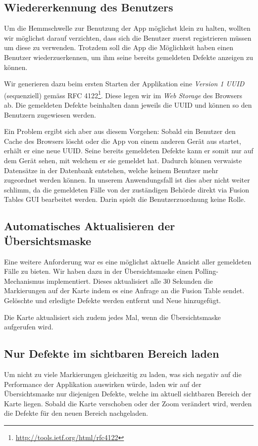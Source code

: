 \subsection{Wiedererkennung des Benutzers}
\label{fixmystreet-user-detection}
Um die Hemmschwelle zur Benutzung der App möglichst klein zu halten, wollten wir möglichst darauf verzichten, dass sich die Benutzer zuerst registrieren müssen um diese zu verwenden. Trotzdem soll die App die Möglichkeit haben einen Benutzer wiederzuerkennen, um ihm seine bereits gemeldeten Defekte anzeigen zu können.

Wir generieren dazu beim ersten Starten der Applikation eine \emph{Version 1 \gls{UUID}} (sequenziell) gemäss RFC 4122\footnote{\url{http://tools.ietf.org/html/rfc4122}}. Diese legen wir im \emph{Web Storage} des Browsers ab. Die gemeldeten Defekte beinhalten dann jeweils die \gls{UUID} und können so den Benutzern zugewiesen werden.

Ein Problem ergibt sich aber aus diesem Vorgehen: Sobald ein Benutzer den Cache des Browsers löscht oder die App von einem anderen Gerät aus startet, erhält er eine neue \gls{UUID}. Seine bereits gemeldeten Defekte kann er somit nur auf dem Gerät sehen, mit welchem er sie gemeldet hat. Dadurch können verwaiste Datensätze in der Datenbank entstehen, welche keinem Benutzer mehr zugeordnet werden können. In unserem Anwendungsfall ist dies aber nicht weiter schlimm, da die gemeldeten Fälle von der zuständigen Behörde direkt via Fusion Tables GUI bearbeitet werden. Darin spielt die Benutzerzuordnung keine Rolle.

\subsection{Automatisches Aktualisieren der Übersichtsmaske}
\label{fixmystreet-polling}
Eine weitere Anforderung war es eine möglichst aktuelle Ansicht aller gemeldeten Fälle zu bieten. Wir haben dazu in der Übersichtsmaske einen Polling-Mechanismus implementiert. Dieses aktualisiert alle 30 Sekunden die Markierungen auf der Karte indem es eine Anfrage an die Fusion Table sendet. Gelöschte und erledigte Defekte werden entfernt und Neue hinzugefügt.

Die Karte aktualisiert sich zudem jedes Mal, wenn die Übersichtsmaske aufgerufen wird.

\subsection{Nur Defekte im sichtbaren Bereich laden}
Um nicht zu viele Markierungen gleichzeitig zu laden, was sich negativ auf die Performance der Applikation auswirken würde, laden wir auf der Übersichtsmaske nur diejenigen Defekte, welche im aktuell sichtbaren Bereich der Karte liegen. Sobald die Karte verschoben oder der Zoom verändert wird, werden die Defekte für den neuen Bereich nachgeladen.

